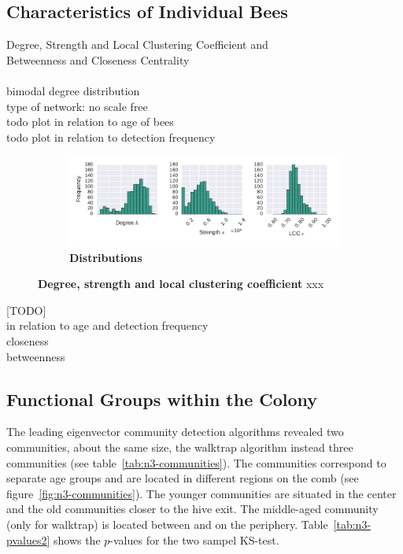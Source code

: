 \subsection{Characteristics of Individual Bees}

Degree, Strength and Local Clustering Coefficient and \\
Betweenness and Closeness Centrality\\
\\
bimodal degree distribution\\
type of network: no scale free\\
todo plot in relation to age of bees\\
todo plot in relation to detection frequency\\

\begin{figure}[!htb]
	\centering
	\begin{subfigure}[b]{1.0\textwidth}
	\centering
	\includegraphics[width=1.0\textwidth]{Figures/n3-stat-degreeStrLCC}
	\caption[Distributions]{\textbf{Distributions}}
	\label{fig:n3-d-s-cc}
	\end{subfigure}
	\caption[Degree, strength and local clustering coefficient]{\textbf{Degree, strength and local clustering coefficient} xxx}
	\label{fig:n3-degreeStrLCC}
\end{figure}

[TODO]\\
in relation to age and detection frequency\\
closeness\\
betweenness\\

\subsection{Functional Groups within the Colony}
The leading eigenvector community detection algorithms revealed two communities, about the same size, the walktrap algorithm instead three communities (see table~\ref{tab:n3-communities}).
The communities correspond to separate age groups and are located in different regions on the comb (see figure~\ref{fig:n3-communities}). The younger communities are situated in the center and the old communities closer to the hive exit. The middle-aged community (only for walktrap) is located between and on the periphery. Table~\ref{tab:n3-pvalues2} shows the $p$-values for the two sampel KS-test.


